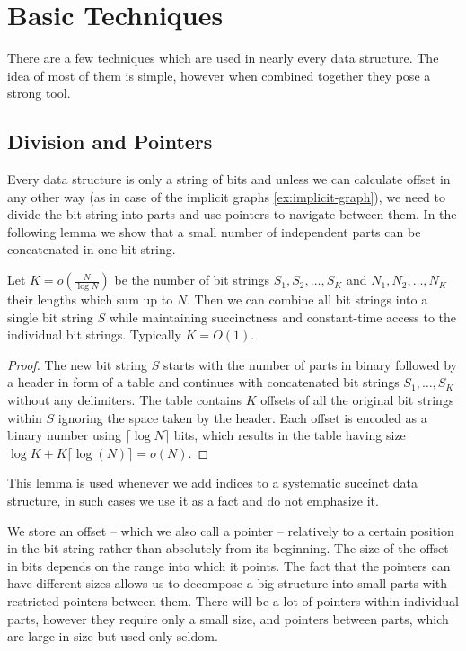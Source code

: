 \section{Basic Techniques}

There are a few techniques which are used in nearly every data structure.
The idea of most of them is simple, however when combined together they pose a strong tool.

\subsection{Division and Pointers}

Every data structure is only a string of bits and unless we can calculate offset in any other way (as in case of the implicit graphs \ref{ex:implicit-graph}), we need to divide the bit string into parts and use pointers to navigate between them.
In the following lemma we show that a small number of independent parts can be concatenated in one bit string.

\begin{lemma}\label{l:concat}
	Let $K = o(\frac{N}{\log N})$ be the number of bit strings $S_1, S_2, \ldots, S_K$ and $N_1, N_2, \dots, N_K$ their lengths which sum up to $N$.
	Then we can combine all bit strings into a single bit string $S$ while maintaining succinctness and constant-time access to the individual bit strings.
	Typically $K = O(1)$.
\end{lemma}
\begin{proof}
	The new bit string $S$ starts with the number of parts in binary followed by a header in form of a table and continues with concatenated bit strings $S_1, \ldots, S_K$ without any delimiters.
	The table contains $K$ offsets of all the original bit strings within $S$ ignoring the space taken by the header.
	Each offset is encoded as a binary number using $\lceil \log N \rceil$ bits, which results in the table having size $\log K + K \lceil \log (N) \rceil = o(N)$.
\end{proof}

This lemma is used whenever we add indices to a systematic succinct data structure, in such cases we use it as a fact and do not emphasize it.

We store an offset -- which we also call a pointer -- relatively to a certain position in the bit string rather than absolutely from its beginning.
The size of the offset in bits depends on the range into which it points.
The fact that the pointers can have different sizes allows us to decompose a big structure into small parts with restricted pointers between them.
There will be a lot of pointers within individual parts, however they require only a small size, and pointers between parts, which are large in size but used only seldom.

